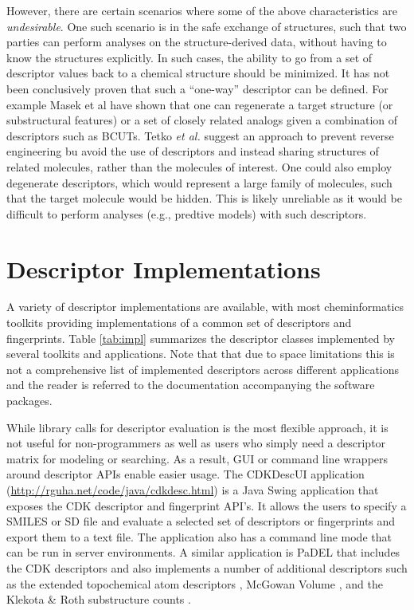 \documentclass[letterpaper, 12pt]{article}
\begin{document}
However, there are certain scenarios where some of the above
characteristics are \emph{undesirable}. One such scenario is in the
safe exchange of structures, such that two parties can perform
analyses on the structure-derived data, without having to know the
structures explicitly. In such cases, the ability to go from a set of
descriptor values back to a chemical structure should be minimized. It
has not been conclusively proven that such a ``one-way'' descriptor
can be defined. For example Masek et al \cite{Masek:2008aa} have shown
that one can regenerate a target structure (or substructural features)
or a set of closely related analogs given a combination of descriptors
such as BCUTs. Tetko \textit{et al.} \cite{Tetko:2005fk} suggest an approach to
prevent reverse engineering bu avoid the use of descriptors and
instead sharing structures of related molecules, rather than the
molecules of interest. One could also employ degenerate descriptors,
which would represent a large family of molecules, such that the
target molecule would be hidden. This is likely unreliable as it would
be difficult to perform analyses (e.g., predtive models) with such
descriptors.

\section{Descriptor Implementations}
\label{sec:descr-impl}

A variety of descriptor implementations are available, with most
cheminformatics toolkits providing implementations of a common set of
descriptors and fingerprints. Table \ref{tab:impl} summarizes the
descriptor classes implemented by several toolkits and
applications. Note that that due to space limitations this is not a
comprehensive list of implemented descriptors across different
applications and the reader is referred to the documentation
accompanying the software packages.

While library calls for descriptor evaluation is the most flexible
approach, it is not useful for non-programmers as well as users who
simply need a descriptor matrix for modeling or searching. As a
result, GUI or command line wrappers around descriptor APIs enable
easier usage. The CDKDescUI application
(\url{http://rguha.net/code/java/cdkdesc.html}) is a Java Swing
application that exposes the CDK descriptor and fingerprint API's. It
allows the users to specify a SMILES or SD file and evaluate a
selected set of descriptors or fingerprints and export them to a text
file. The application also has a command line mode that can be run in
server environments. A similar application is PaDEL \cite{Yap:2011fk}
that includes the CDK descriptors and also implements a number of
additional descriptors such as the extended topochemical atom
descriptors \cite{Roy:2004uq}, McGowan Volume \cite{Zhao:2003kx}, and
the Klekota \& Roth substructure counts \cite{Klekota:2008vn}.
\end{document}
